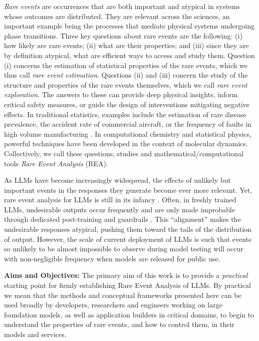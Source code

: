\documentclass{article}
\begin{document}
\textit{Rare events} are occurrences that are both important and atypical in systems whose outcomes are distributed. They are relevant across the sciences, an important example being the processes that mediate physical systems undergoing phase transitions. Three key questions about rare events are the following: (i) how likely are rare events; (ii) what are their properties; and (iii) since they are by definition atypical, what are efficient ways to access and study them. Question (i) concerns the estimation of statistical properties of the rare events, which we thus call \textit{rare event estimation}. Questions (ii) and (iii) concern the study of the structure and properties of the rare events themselves, which we call \textit{rare event exploration}. The answers to these can provide deep physical insights, inform critical safety measures, or guide the design of interventions mitigating negative effects.
In traditional statistics, examples include the estimation of rare disease prevalence, the accident rate of commercial aircraft, or the frequency of faults in high volume manufacturing \cite{mcgrath2024binomial}. In computational chemistry and statistical physics, powerful techniques have been developed in the context of molecular dynamics. Collectively, we call these questions, studies and mathematical/computational tools \textit{Rare Event Analysis} (REA).

As LLMs have become increasingly widespread, the effects of unlikely but important events in the responses they generate become ever more relevant. Yet, rare event analysis for LLMs is still in its infancy \cite{wu2025estimating,jones2025forecasting}.
Often, in freshly trained LLMs, undesirable outputs
occur frequently and are only made improbable through dedicated post-training and guardrails \cite{mazeika2024harmbench, lambert2025tulu}. This ``alignment'' makes the undesirable responses atypical, pushing them toward the tails of the distribution of output. However, the scale of current deployment of LLMs is such that events so unlikely to be almost impossible to observe during model testing will occur with non-negligible frequency when models are released for public use.

\textbf{Aims and Objectives:} The primary aim of this work is to provide a \textit{practical} starting point for firmly establishing Rare Event Analysis of LLMs.
By practical we mean that the methods and conceptual frameworks presented here can be used broadly by developers, researchers and engineers working on large foundation models, as well as application builders in critical domains, to begin to understand the properties of rare events, and how to control them, in their models and services.
\end{document}
